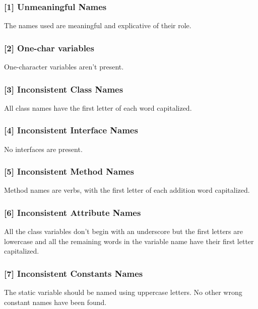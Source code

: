 \subsubsection{[1] Unmeaningful Names}
The names used are meaningful and explicative of their role.


\subsubsection{[2] One-char variables}
One-character variables aren't present.

\subsubsection{[3] Inconsistent Class Names}
All class names have the first letter of each word capitalized. 

\subsubsection{[4] Inconsistent Interface Names}
No interfaces are present.

\subsubsection{[5] Inconsistent Method Names}
Method names are verbs, with the first letter of each addition word capitalized.

\subsubsection{[6] Inconsistent Attribute Names}
All the class variables don't begin with an underscore but the first letters are lowercase and all the remaining words in the variable name have their first letter capitalized.

\subsubsection{[7] Inconsistent Constants Names}
The  static variable  should be named using uppercase letters.
No other wrong constant names have been found.